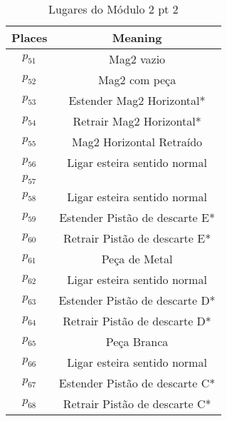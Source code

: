 \begin{table}[htbp]
\caption{Lugares do Módulo 2 pt 2}
\centering
\begin{tabular}{c|c}
Places & Meaning\\
\hline
\hyperlink{partialNet:p51}{\hypertarget{partialTable:p51}{$p_{51}$}} & Mag2 vazio\\
\hyperlink{partialNet:p52}{\hypertarget{partialTable:p52}{$p_{52}$}} & Mag2 com peça\\
\hyperlink{partialNet:p53}{\hypertarget{partialTable:p53}{$p_{53}$}} & Estender Mag2 Horizontal*\\
\hyperlink{partialNet:p54}{\hypertarget{partialTable:p54}{$p_{54}$}} & Retrair Mag2 Horizontal*\\
\hyperlink{partialNet:p55}{\hypertarget{partialTable:p55}{$p_{55}$}} & Mag2 Horizontal Retraído\\
\hyperlink{partialNet:p56}{\hypertarget{partialTable:p56}{$p_{56}$}} & Ligar esteira sentido normal\\
\hyperlink{partialNet:p57}{\hypertarget{partialTable:p57}{$p_{57}$}} & \\
\hyperlink{partialNet:p58}{\hypertarget{partialTable:p58}{$p_{58}$}} & Ligar esteira sentido normal\\
\hyperlink{partialNet:p59}{\hypertarget{partialTable:p59}{$p_{59}$}} & Estender Pistão de descarte E*\\
\hyperlink{partialNet:p60}{\hypertarget{partialTable:p60}{$p_{60}$}} & Retrair Pistão de descarte E*\\
\hyperlink{partialNet:p61}{\hypertarget{partialTable:p61}{$p_{61}$}} & Peça de Metal\\
\hyperlink{partialNet:p62}{\hypertarget{partialTable:p62}{$p_{62}$}} & Ligar esteira sentido normal\\
\hyperlink{partialNet:p63}{\hypertarget{partialTable:p63}{$p_{63}$}} & Estender Pistão de descarte D*\\
\hyperlink{partialNet:p64}{\hypertarget{partialTable:p64}{$p_{64}$}} & Retrair Pistão de descarte D*\\
\hyperlink{partialNet:p65}{\hypertarget{partialTable:p65}{$p_{65}$}} & Peça Branca\\
\hyperlink{partialNet:p66}{\hypertarget{partialTable:p66}{$p_{66}$}} & Ligar esteira sentido normal\\
\hyperlink{partialNet:p67}{\hypertarget{partialTable:p67}{$p_{67}$}} & Estender Pistão de descarte C*\\
\hyperlink{partialNet:p68}{\hypertarget{partialTable:p68}{$p_{68}$}} & Retrair Pistão de descarte C*\\

\end{tabular}
\end{table}
